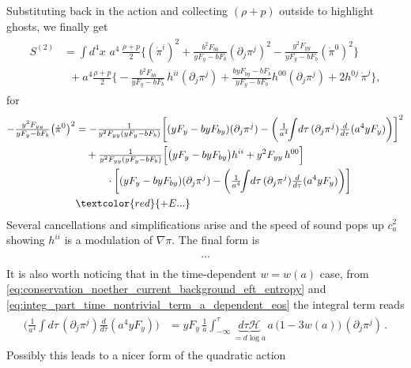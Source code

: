 %
Substituting back in the action and collecting $(\rho+p)$ outside to highlight ghosts, we finally get
{\small
\begin{align}
\begin{aligned}
    S^{(2)}&=
    \int d^4x\,\, a^4\,\frac{\rho+p}{2}\bigg\{
    (\dot{\pi}^i)^2 +\tfrac{b^2 F_{bb}}{yF_y-bF_b} (\partial_j \pi^j)^2-\tfrac{y^2F_{yy}}{yF_y-bF_b} (\dot{\pi}^0)^2\bigg\}\\
    & \,\,\,+ a^4\frac{\rho+p}{2}\bigg\{-\tfrac{b^2 F_{bb}}{yF_y-bF_b}\, h^{ii}(\partial_j \pi^j)
    + \tfrac{byF_{by}-bF_b}{yF_y-bF_b} h^{00}(\partial_j \pi^j)+2 h^{0j}\,\dot{\pi}^j \bigg\},
\end{aligned}
\end{align}}
for 
{\small
\begin{align}
\begin{aligned}
    -\tfrac{y^2F_{yy}}{yF_y-bF_b}\big(\dot{\pi}^0\big)^2
    &=-\tfrac{1}{y^2F_{yy}(yF_y-bF_b)}\bigg[(yF_y-byF_{by}) (\partial_j\pi^j)-\bigg(\tfrac{1}{a^4}\!\!\int\! d\tau\,(\partial_j \pi^j)\tfrac{d}{d\tau}(a^4yF_y)\bigg)\bigg]^2\\
    &\quad+\tfrac{1}{y^2F_{yy}(yF_y-bF_b)}\Big[\big({y}F_y - byF_{by}\big) h^{ii}+ y^2 F_{yy}\, h^{00}\Big]\\
    &\quad\qquad\cdot \bigg[(yF_y-byF_{by}) (\partial_j\pi^j)-\bigg(\tfrac{1}{a^4}\!\!\int\! d\tau\,(\partial_j \pi^j)\tfrac{d}{d\tau}(a^4yF_y)\bigg)\bigg]\\
    &\textcolor{red}{+E...}
\end{aligned}
\end{align}}
Several cancellations and simplifications arise and the speed of sound pops up $c_a^2$ showing $h^{ii}$ is a modulation of $\nabla\pi$.
The final form is
{\small
\begin{align}
\begin{aligned}
    ...
\end{aligned}
\end{align}}
It is also worth noticing that in the time-dependent $w=w(a)$ case, from \eqref{eq:conservation_noether_current_background_eft_entropy} and \eqref{eq:integ_part_time_nontrivial_term_a_dependent_eos} the integral term reads
{\small\begin{align}
\begin{aligned}
    \bigg(\tfrac{1}{a^4}\!\!\int d\tau\,(\partial_j \pi^j)\tfrac{d}{d\tau}(a^4yF_y)\bigg) &= 
    yF_y\, \frac{1}{a}\!\!\int_{-\infty}^\tau \!\!\underbrace{d\tau\mathcal{H}}_{=d\log\!a}\,a\, \big(1-3w(a)\big)\, (\partial_j \pi^j)\,.
\end{aligned}\end{align}}
Possibly this leads to a nicer form of the quadratic action

